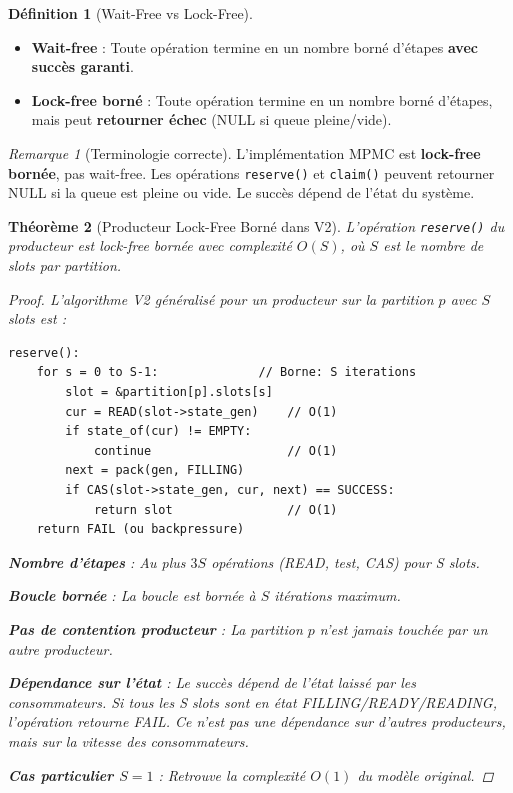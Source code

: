 \documentclass[11pt,a4paper]{article}
\theoremstyle{plain}
\newtheorem{theorem}{Théorème}[section]
\theoremstyle{definition}
\newtheorem{definition}[theorem]{Définition}
\theoremstyle{remark}
\newtheorem*{remark}{Remarque}
\begin{document}
\begin{definition}[Wait-Free vs Lock-Free]
\begin{itemize}
    \item \textbf{Wait-free} : Toute opération termine en un nombre borné d'étapes \textbf{avec succès garanti}.
    \item \textbf{Lock-free borné} : Toute opération termine en un nombre borné d'étapes, mais peut \textbf{retourner échec} (NULL si queue pleine/vide).
\end{itemize}
\end{definition}

\begin{remark}[Terminologie correcte]
L'implémentation MPMC est \textbf{lock-free bornée}, pas wait-free. Les opérations \texttt{reserve()} et \texttt{claim()} peuvent retourner NULL si la queue est pleine ou vide. Le succès dépend de l'état du système.
\end{remark}

\begin{theorem}[Producteur Lock-Free Borné dans V2]\label{thm:producer_wait_free}
L'opération \texttt{reserve()} du producteur est lock-free bornée avec complexité $O(S)$, où $S$ est le nombre de slots par partition.

\begin{proof}
L'algorithme V2 généralisé pour un producteur sur la partition $p$ avec $S$ slots est :
\begin{lstlisting}
reserve():
    for s = 0 to S-1:              // Borne: S iterations
        slot = &partition[p].slots[s]
        cur = READ(slot->state_gen)    // O(1)
        if state_of(cur) != EMPTY:
            continue                   // O(1)
        next = pack(gen, FILLING)
        if CAS(slot->state_gen, cur, next) == SUCCESS:
            return slot                // O(1)
    return FAIL (ou backpressure)
\end{lstlisting}

\textbf{Nombre d'étapes} : Au plus $3S$ opérations (READ, test, CAS) pour S slots.

\textbf{Boucle bornée} : La boucle est bornée à $S$ itérations maximum.

\textbf{Pas de contention producteur} : La partition $p$ n'est jamais touchée par un autre producteur.

\textbf{Dépendance sur l'état} : Le succès dépend de l'état laissé par les consommateurs. Si tous les S slots sont en état FILLING/READY/READING, l'opération retourne FAIL. Ce n'est pas une dépendance sur d'autres producteurs, mais sur la vitesse des consommateurs.

\textbf{Cas particulier $S=1$} : Retrouve la complexité $O(1)$ du modèle original.
\end{proof}
\end{theorem}
\end{document}
